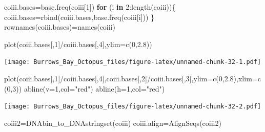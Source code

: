 \documentclass[
]{article}
\newenvironment{Shaded}{\begin{snugshade}}{\end{snugshade}}
\newcommand{\AttributeTok}[1]{\textcolor[rgb]{0.77,0.63,0.00}{#1}}
\newcommand{\ControlFlowTok}[1]{\textcolor[rgb]{0.13,0.29,0.53}{\textbf{#1}}}
\newcommand{\DecValTok}[1]{\textcolor[rgb]{0.00,0.00,0.81}{#1}}
\newcommand{\FloatTok}[1]{\textcolor[rgb]{0.00,0.00,0.81}{#1}}
\newcommand{\FunctionTok}[1]{\textcolor[rgb]{0.00,0.00,0.00}{#1}}
\newcommand{\NormalTok}[1]{#1}
\newcommand{\OtherTok}[1]{\textcolor[rgb]{0.56,0.35,0.01}{#1}}
\newcommand{\SpecialCharTok}[1]{\textcolor[rgb]{0.00,0.00,0.00}{#1}}
\newcommand{\StringTok}[1]{\textcolor[rgb]{0.31,0.60,0.02}{#1}}
\begin{document}
\begin{Shaded}
\begin{Highlighting}[]
\NormalTok{coiii.bases}\OtherTok{=}\FunctionTok{base.freq}\NormalTok{(coiii[}\DecValTok{1}\NormalTok{])}
\ControlFlowTok{for}\NormalTok{ (i }\ControlFlowTok{in} \DecValTok{2}\SpecialCharTok{:}\FunctionTok{length}\NormalTok{(coiii))\{}
\NormalTok{  coiii.bases}\OtherTok{=}\FunctionTok{rbind}\NormalTok{(coiii.bases,}\FunctionTok{base.freq}\NormalTok{(coiii[i]))  }
\NormalTok{\}}
\FunctionTok{rownames}\NormalTok{(coiii.bases)}\OtherTok{=}\FunctionTok{names}\NormalTok{(coiii)}
\end{Highlighting}
\end{Shaded}

\begin{Shaded}
\begin{Highlighting}[]
\FunctionTok{plot}\NormalTok{(coiii.bases[,}\DecValTok{1}\NormalTok{]}\SpecialCharTok{/}\NormalTok{coiii.bases[,}\DecValTok{4}\NormalTok{],}\AttributeTok{ylim=}\FunctionTok{c}\NormalTok{(}\DecValTok{0}\NormalTok{,}\FloatTok{2.8}\NormalTok{))}
\end{Highlighting}
\end{Shaded}

\texttt{[image: Burrows\_Bay\_Octopus\_files/figure-latex/unnamed-chunk-32-1.pdf]}

\begin{Shaded}
\begin{Highlighting}[]
\FunctionTok{plot}\NormalTok{(coiii.bases[,}\DecValTok{1}\NormalTok{]}\SpecialCharTok{/}\NormalTok{coiii.bases[,}\DecValTok{4}\NormalTok{],coiii.bases[,}\DecValTok{2}\NormalTok{]}\SpecialCharTok{/}\NormalTok{coiii.bases[,}\DecValTok{3}\NormalTok{],}\AttributeTok{ylim=}\FunctionTok{c}\NormalTok{(}\DecValTok{0}\NormalTok{,}\FloatTok{2.8}\NormalTok{),}\AttributeTok{xlim=}\FunctionTok{c}\NormalTok{(}\DecValTok{0}\NormalTok{,}\DecValTok{3}\NormalTok{))}
\FunctionTok{abline}\NormalTok{(}\AttributeTok{v=}\DecValTok{1}\NormalTok{,}\AttributeTok{col=}\StringTok{"red"}\NormalTok{)}
\FunctionTok{abline}\NormalTok{(}\AttributeTok{h=}\DecValTok{1}\NormalTok{,}\AttributeTok{col=}\StringTok{"red"}\NormalTok{)}
\end{Highlighting}
\end{Shaded}

\texttt{[image: Burrows\_Bay\_Octopus\_files/figure-latex/unnamed-chunk-32-2.pdf]}

\begin{Shaded}
\begin{Highlighting}[]
\NormalTok{coiii2}\OtherTok{=}\FunctionTok{DNAbin\_to\_DNAstringset}\NormalTok{(coiii)}
\NormalTok{coiii.align}\OtherTok{=}\FunctionTok{AlignSeqs}\NormalTok{(coiii2)}
\end{Highlighting}
\end{Shaded}
\end{document}
